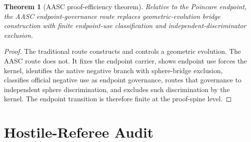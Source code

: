 \documentclass[11pt]{article}
\newtheorem{theorem}{Theorem}[section]
\begin{document}
\begin{theorem}[AASC proof-efficiency theorem]
Relative to the Poincare endpoint, the AASC endpoint-governance route replaces geometric-evolution bridge construction with finite endpoint-use classification and independent-discriminator exclusion.
\end{theorem}
\begin{proof}
The traditional route constructs and controls a geometric evolution. The AASC route does not. It fixes the endpoint carrier, shows endpoint use forces the kernel, identifies the native negative branch with sphere-bridge exclusion, classifies official negative use as endpoint governance, routes that governance to independent sphere discrimination, and excludes such discrimination by the kernel. The endpoint transition is therefore finite at the proof-spine level.
\end{proof}

\section{Hostile-Referee Audit}\label{sec:hostile}
\end{document}
